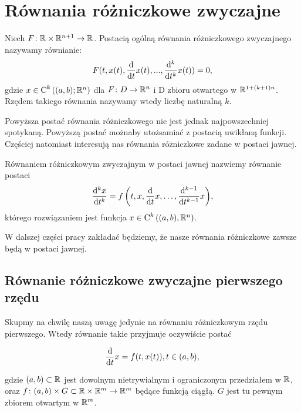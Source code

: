\documentclass[12pt,a4paper]{report}
\begin{document}
\section{Równania różniczkowe zwyczajne}

\begin{definition}
Niech $F \colon \setR \times \setR^{n+1} \to \setR$. Postacią ogólną równania różniczkowego zwyczajnego nazywamy równianie: 
\begin{equation*}
F(t, x(t), \ddx{t} x(t),..., \ddx[^k]{t^k} x(t) ) = 0,
\end{equation*}
gdzie $x \in \Ck{k}{(a,b); \setR^n}$ dla $F \colon D \to \setR^n$ i D zbioru otwartego w $\setR^{1+(k+1)n}$. 
Rzędem takiego równania nazywamy wtedy liczbę naturalną $k$. 
\end{definition}

Powyższa postać równania różniczkowego nie jest jednak najpowszechniej spotykaną. Powyższą postać możnaby utożsamiać z postacią uwikłaną funkcji. Częściej natomiast interesują nas równania różniczkowe zadane w postaci jawnej.

\begin{definition}
Równaniem różniczkowym zwyczajnym w postaci jawnej nazwiemy równanie postaci
$$
\ddx[{^k x}]{t^k} = \function{f}{t,x,\ddx{t}x, \ldots, \ddx[{^{k-1}}]{t^{k-1}} x},
$$
którego rozwiązaniem jest funkcja $x \in \Ck{k}{(a,b), \setR^n}$.
\end{definition}


W dalszej części pracy zakładać będziemy, że nasze równania różniczkowe zawsze będą w postaci jawnej.


\subsection{Równanie różniczkowe zwyczajne pierwszego rzędu}

Skupmy na chwilę naszą uwagę jedynie na równaniu różniczkowym rzędu pierwszego. Wtedy równanie takie przyjmuje oczywiście postać 

$$
\ddx{t}x = f(t,x(t)), t \in (a,b) ,
$$ 

gdzie $(a,b) \subset \setR$ jest dowolnym nietrywialnym i ograniczonym przedziałem w $\setR$, oraz $ f \colon (a,b) \times G \subset \setR \times \setR^m \to \setR^m$ będące funkcją ciągłą. $G$ jest tu pewnym zbiorem otwartym w $\setR^m$. 
\end{document}
